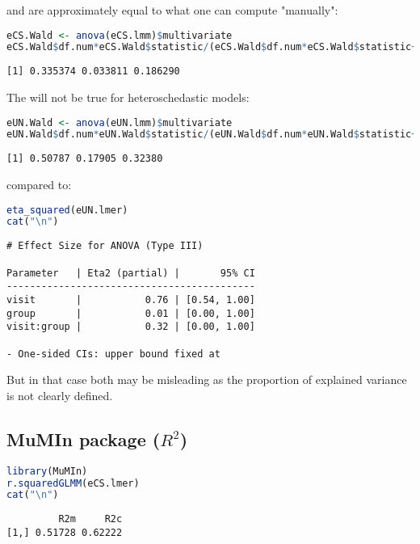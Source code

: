 \documentclass[12pt]{article}
\begin{document}
and are approximately equal to what one can compute "manually":
\begin{lstlisting}[language=r,numbers=none]
eCS.Wald <- anova(eCS.lmm)$multivariate
eCS.Wald$df.num*eCS.Wald$statistic/(eCS.Wald$df.num*eCS.Wald$statistic+eCS.Wald$df.denom)
\end{lstlisting}

\label{}
\begin{verbatim}
[1] 0.335374 0.033811 0.186290
\end{verbatim}


The will not be true for heteroschedastic models:
\begin{lstlisting}[language=r,numbers=none]
eUN.Wald <- anova(eUN.lmm)$multivariate
eUN.Wald$df.num*eUN.Wald$statistic/(eUN.Wald$df.num*eUN.Wald$statistic+eUN.Wald$df.denom)
\end{lstlisting}

\label{}
\begin{verbatim}
[1] 0.50787 0.17905 0.32380
\end{verbatim}


compared to:
\begin{lstlisting}[language=r,numbers=none]
eta_squared(eUN.lmer)
cat("\n")
\end{lstlisting}

\label{}
\begin{verbatim}
# Effect Size for ANOVA (Type III)

Parameter   | Eta2 (partial) |       95% CI
-------------------------------------------
visit       |           0.76 | [0.54, 1.00]
group       |           0.01 | [0.00, 1.00]
visit:group |           0.32 | [0.00, 1.00]

- One-sided CIs: upper bound fixed at
\end{verbatim}


But in that case both may be misleading as the proportion of explained
variance is not clearly defined.
\subsection{MuMIn package (\(R^2\))}
\label{sec:org81072cc}

\begin{lstlisting}[language=r,numbers=none]
library(MuMIn)
r.squaredGLMM(eCS.lmer)
cat("\n")
\end{lstlisting}

\label{}
\begin{verbatim}
         R2m     R2c
[1,] 0.51728 0.62222
\end{verbatim}
\end{document}
